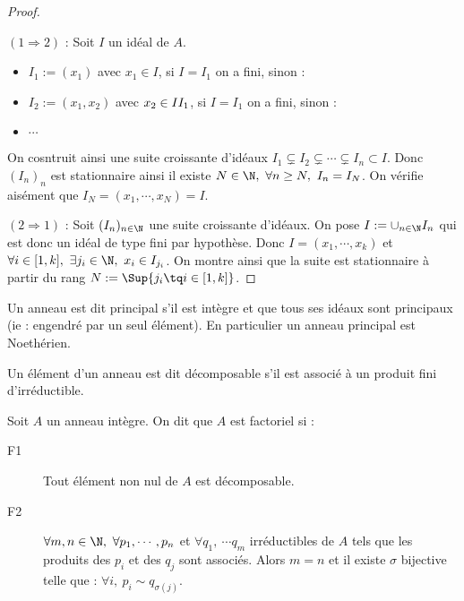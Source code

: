 \begin{proof}\

$(1\Rightarrow2)$ : Soit $I$ un idéal de $A$.
\begin{itemize}
 \item $I_1 := (x_1)$ avec $x_1\in I$, si $I = I_1$ on a fini, sinon :
 \item $I_2 := (x_1,x_2)$ avec $x_2 \in I\- I_1$, si $I = I_1$ on a
fini, sinon :
 \item $\cdots$
\end{itemize}
On cosntruit ainsi une suite croissante d'idéaux $I_1\subsetneq I_2 \subsetneq
\cdots \subsetneq I_n \subset I$. Donc $(I_n)_n$ est stationnaire ainsi il
existe $N\in\N,\ \forall n \geq N,\ I_n = I_N$. On vérifie aisément que $I_N =
(x_1,\cdots,x_N) = I$.

$(2\Rightarrow1)$ : Soit $(I_n)_{n\in\N}$ une suite croissante d'idéaux. On
pose $I := \cup_{n\in\N} I_n$ qui est donc un idéal de type fini par hypothèse.
Donc $I = (x_1,\cdots,x_k)$ et $\forall i \in[1,k],\ \exists j_i \in\N,\ x_i
\in I_{j_i}$. On montre ainsi que la suite est stationnaire à partir du rang $N
:= \Sup \{j_i\tq i\in[1,k]\}$.
\end{proof}

\begin{defi}

Un anneau est dit principal s'il est intègre et que tous ses idéaux sont
principaux (ie : engendré par un seul élément). En particulier un anneau
principal est Noethérien.
\end{defi}

\begin{defi}

Un élément d'un anneau est dit décomposable s'il est associé à un produit fini
d'irréductible.
\end{defi}


\begin{defi}
 
Soit $A$ un anneau intègre. On dit que $A$ est factoriel si :
\begin{description}
 \item[F1] Tout élément non nul de $A$ est décomposable.
 \item[F2] $\forall m,n\in \N,\ \forall p_1, \cdots, p_n$ et $\forall
q_1,\ \cdots q_m$ irréductibles de $A$ tels que les produits des $p_i$ et des
$q_j$ sont associés. Alors $m=n$ et il existe $\sigma$ bijective telle
que : $\forall i,\ p_i\sim q_{\sigma(j)}$.
\end{description}
\end{defi}

